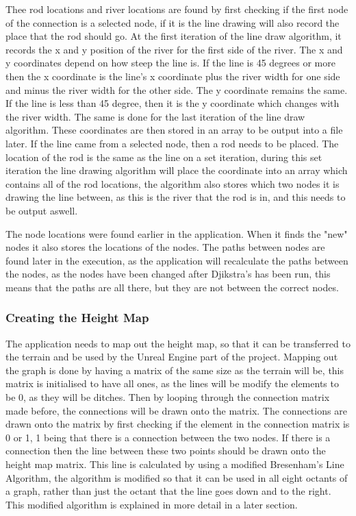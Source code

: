 	Thee rod locations and river locations are found by first checking if the first node of the connection is a selected node, if it is the line drawing will also record the place that the rod should go. At the first iteration of the line draw algorithm, it records the x and y position of the river for the first side of the river. The x and y coordinates depend on how steep the line is. If the line is 45 degrees or more then the x coordinate is the line's x coordinate plus the river width for one side and minus the river width for the other side. The y coordinate remains the same. If the line is less than 45 degree, then it is the y coordinate which changes with the river width. The same is done for the last iteration of the line draw algorithm. These coordinates are then stored in an array to be output into a file later. If the line came from a selected node, then a rod needs to be placed. The location of the rod is the same as the line on a set iteration, during this set iteration the line drawing algorithm will place the coordinate into an array which contains all of the rod locations, the algorithm also stores which two nodes it is drawing the line between, as this is the river that the rod is in, and this needs to be output aswell.
	\newline
	\par
	The node locations were found earlier in the application. When it finds the "new" nodes it also stores the locations of the nodes. The paths between nodes are found later in the execution, as the application will recalculate the paths between the nodes, as the nodes have been changed after Djikstra's has been run, this means that the paths are all there, but they are not between the correct nodes.

\subsubsection{Creating the Height Map}


	The application needs to map out the height map, so that it can be transferred to the terrain and be used by the Unreal Engine part of the project. Mapping out the graph is done by having a matrix of the same size as the terrain will be, this matrix is initialised to have all ones, as the lines will be modify the elements to be 0, as they will be ditches. Then by looping through the connection matrix made before, the connections will be drawn onto the matrix. The connections are drawn onto the matrix by first checking if the element in the connection matrix is 0 or 1, 1 being that there is a connection between the two nodes. If there is a connection then the line between these two points should be drawn onto the height map matrix. This line is calculated by using a modified Bresenham's Line Algorithm, the algorithm is modified so that it can be used in all eight octants of a graph, rather than just the octant that the line goes down and to the right. This modified algorithm is explained in more detail in a later section.

